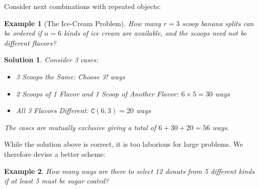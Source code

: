 \documentclass[12pt, letterpaper, onecolumn, conference, final]{IEEEtran}
\theoremstyle{definition}
\newtheorem{definition}{Definition}[section]
\theoremstyle{plain}
\newtheorem{example}{Example}[section]
\newtheorem{solution}{Solution}[section]
\begin{document}
\noindent
Consider next combinations with repeated objects:

\begin{example}[The Ice-Cream Problem]
How many $r=3$ scoop banana splits can be ordered if $n=6$ kinds of ice cream are available, and the scoops need not be different flavors?
\end{example}
\begin{solution}
Consider 3 cases:
\begin{itemize}

\vspace{.2cm}
\item[(i)]
3 Scoops the Same: Choose 3! ways

\vspace{.2cm}
\item[(ii)]
2 Scoops of 1 Flavor and 1 Scoop of Another Flavor: $6 \times 5 = 30$ ways

\vspace{.2cm}
\item[(iii)]
All 3 Flavors Different: $\mathtt{C}(6,3) = 20$ ways

\end{itemize}
The cases are mutually exclusive giving a total of $6+30+20 = 56$ ways. 
\end{solution}

\noindent
While the solution above is correct, it is too laborious for large problems. We therefore devise a better scheme:

\begin{center}
\end{center}

\begin{example}
How many ways are there to select 12 donuts from 5 different kinds if at least 5 must be sugar coated?
\end{example}
\end{document}

